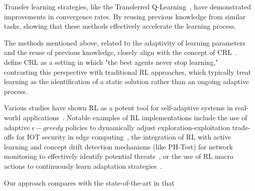 Transfer learning strategies, like the Transferred Q-Learning~\cite{chen2022transferredqlearning}, 
have demonstrated improvements in convergence rates. By reusing previous knowledge from similar 
tasks, showing that these methods effectively accelerate the learning process.

The methods mentioned above, related to the adaptivity of learning parameters and the reuse of 
previous knowledge, closely align with the concept of 
\ac{CRL}~\cite{khetarpal2022continualreinforcementlearningreview}. 
\citet{abel2023definitioncontinualreinforcementlearning} define \ac{CRL} as a setting in which "the 
best agents never stop learning," contrasting this perspective with traditional \ac{RL} approaches, 
which typically treat learning as the identification of a static solution rather than an ongoing adaptive 
process.

Various studies have shown \ac{RL} as a potent tool for self-adaptive systems in real-world 
applications~\cite{HENRICHS2022106940}. Notable examples of \ac{RL} implementations 
include the use of adaptive $\epsilon-greedy$ policies to dynamically adjust exploration-exploitation 
trade-offs for \ac{IOT} security in edge computing~\cite{iotdynamicrl}, the integration of \ac{RL} 
with active learning and concept drift detection mechanisms (like PH-Test) for network monitoring to 
effectively identify potential threats~\cite{networkdynamicrl}, or the use of \ac{RL} macro actions to 
continuously learn adaptation strategies~\cite{cardozo23}.

Our approach compares with the state-of-the-art in that 


\endinput


